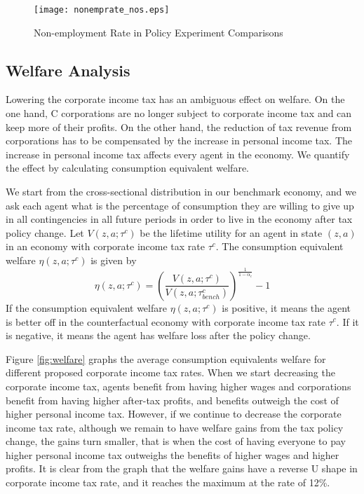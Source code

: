 \documentclass[12pt]{article}
\begin{document}
\begin{figure}[!ht]
\centering
\caption{\sc Non-employment Rate in Policy Experiment Comparisons }
\texttt{[image: nonemprate\_nos.eps]}\label{fig:nonemprate_nos}
\end{figure}

\subsection{Welfare Analysis}

Lowering the corporate income tax has an ambiguous effect on welfare. On the one hand, C corporations are no longer subject to corporate income tax and can keep more of their profits. On the other hand, the reduction of tax revenue from corporations has to be compensated by the increase in personal income tax. The increase in personal income tax affects every agent in the economy. We quantify the effect by calculating consumption equivalent welfare.

We start from the cross-sectional distribution in our benchmark economy, and
we ask each agent what is the percentage of consumption they are willing to
give up in all contingencies in all future periods in order to live in the
economy after tax policy change. Let $V(z,a;\tau^c)$ be the lifetime utility
for an agent in state $(z,a)$ in an economy with corporate income tax rate $\tau^c$. The consumption equivalent welfare $\eta(z,a;\tau^c)$ is given by 
\begin{equation}
\eta(z,a;\tau^c)=\left(\frac{V(z,a;\tau^c)}{V(z,a;\tau^c_{bench})}\right)^{\frac{1}{1-\alpha_c}}-1
\end{equation}
If the consumption equivalent welfare $\eta(z,a;\tau^c)$ is positive, it means the
agent is better off in the counterfactual economy with corporate income tax rate $\tau^c$. If it is negative, it means the agent has welfare loss after the policy change. 

Figure \ref{fig:welfare} graphs the average consumption equivalents welfare for different proposed corporate income tax rates. When we start decreasing the corporate income tax, agents benefit from having higher wages and corporations benefit from having higher after-tax profits, and benefits outweigh the cost of higher personal income tax. However, if we continue to decrease the corporate income tax rate, although we remain to have welfare gains from the tax policy change, the gains turn smaller, that is when the cost of having everyone to pay higher personal income tax outweighs the benefits of higher wages and higher profits. It is clear from the graph that the welfare gains have a reverse U shape in corporate income tax rate, and it reaches the maximum at the rate of 12\%. 
\end{document}
